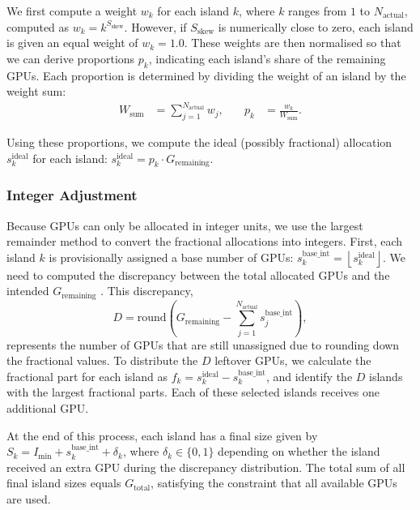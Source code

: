 We first compute a weight $w_k$ for each island $k$, where $k$ ranges from $1$ to $N_{\text{actual}}$, computed as $w_k = k^{S_{\text{skew}}}$.
However, if $S_{\text{skew}}$ is numerically close to zero, each island is given an equal weight of $w_k = 1.0$.
These weights are then normalised so that we can derive proportions \( p_k \), indicating each island's share of the remaining GPUs. Each proportion is determined by dividing the weight of an island by the weight sum:
\[
\begin{aligned}
W_{\text{sum}} &= \sum_{j=1}^{N_{\text{actual}}} w_j, \quad &
p_k &= \frac{w_k}{W_{\text{sum}}}.
\end{aligned}
\]

Using these proportions, we compute the ideal (possibly fractional) allocation $s_k^{\text{ideal}}$ for each island: \(s_k^{\text{ideal}} = p_k \cdot G_{\text{remaining}}\).

\subsubsection{Integer Adjustment}

Because GPUs can only be allocated in integer units, we use the largest remainder method to convert the fractional allocations into integers.
First, each island $k$ is provisionally assigned a base number of GPUs: \(s_k^{\text{base\_int}} = \left\lfloor s_k^{\text{ideal}} \right\rfloor\).
We need to computed the discrepancy between the total allocated GPUs and the intended $G_{\text{remaining}}$ . This discrepancy,
\[
D = \text{round} \left( G_{\text{remaining}} - \sum_{j=1}^{N_{\text{actual}}} s_j^{\text{base\_int}} \right),
\]
represents the number of GPUs that are still unassigned due to rounding down the fractional values.
To distribute the $D$ leftover GPUs, we calculate the fractional part for each island as \(f_k = s_k^{\text{ideal}} - s_k^{\text{base\_int}}\), and identify the $D$ islands with the largest fractional parts. Each of these selected islands receives one additional GPU.

At the end of this process, each island has a final size given by \(S_k = I_{\text{min}} + s_k^{\text{base\_int}} + \delta_k\), where $\delta_k \in \{0, 1\}$ depending on whether the island received an extra GPU during the discrepancy distribution.
The total sum of all final island sizes equals $G_{\text{total}}$, satisfying the constraint that all available GPUs are used.

